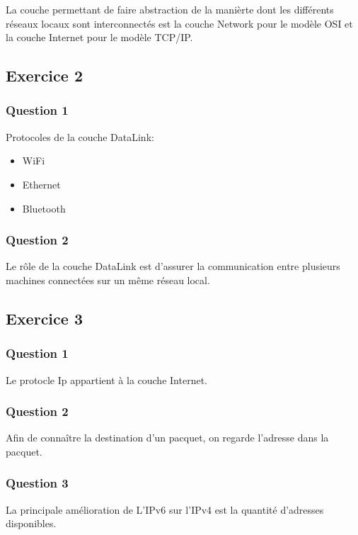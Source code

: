 La couche permettant de faire abstraction de la manièrte dont les différents réseaux locaux sont interconnectés
est la couche Network pour le modèle OSI et la couche Internet pour le modèle TCP/IP.

\subsection{Exercice 2}

\subsubsection{Question 1}

Protocoles de la couche DataLink:
\begin{itemize}
  \item WiFi
  \item Ethernet
  \item Bluetooth
\end{itemize}

\subsubsection{Question 2}

Le rôle de la couche DataLink est d'assurer la communication entre plusieurs machines connectées sur un même réseau local.

\subsection{Exercice 3}

\subsubsection{Question 1}

Le protocle Ip appartient à la couche Internet.

\subsubsection{Question 2}

Afin de connaître la destination d'un pacquet, on regarde l'adresse dans la pacquet.

\subsubsection{Question 3}

La principale amélioration de L'IPv6 sur l'IPv4 est la quantité d'adresses disponibles.

